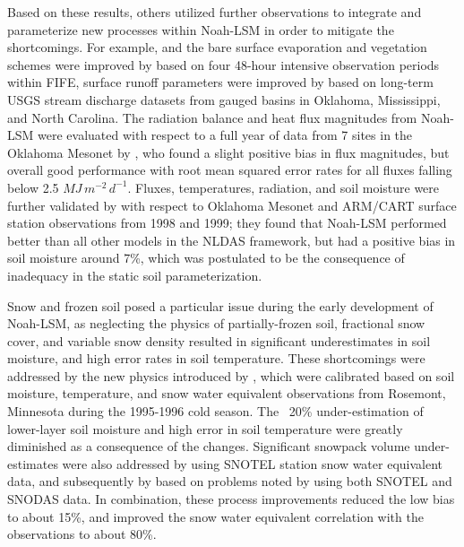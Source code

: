 Based on these results, others utilized further observations to integrate and parameterize new processes within Noah-LSM in order to mitigate the shortcomings. For example, and the bare surface evaporation and vegetation schemes were improved by \citep{betts_assessment_1997} based on four 48-hour intensive observation periods within FIFE, surface runoff parameters were improved by \citep{schaake_simple_1996} based on long-term USGS stream discharge datasets from gauged basins in Oklahoma, Mississippi, and North Carolina. The radiation balance and heat flux magnitudes from Noah-LSM were evaluated with respect to a full year of data from 7 sites in the Oklahoma Mesonet by \citep{sridhar_validation_2002}, who found a slight positive bias in flux magnitudes, but overall good performance with root mean squared error rates for all fluxes falling below 2.5 $MJ\,m^{-2}\,d^{-1}$. Fluxes, temperatures, radiation, and soil moisture were further validated by \citep{robock_evaluation_2003} with respect to Oklahoma Mesonet and ARM/CART surface station observations from 1998 and 1999; they found that Noah-LSM performed better than all other models in the NLDAS framework, but had a positive bias in soil moisture around 7\%, which was postulated to be the consequence of inadequacy in the static soil parameterization.

Snow and frozen soil posed a particular issue during the early development of Noah-LSM, as neglecting the physics of partially-frozen soil, fractional snow cover, and variable snow density resulted in significant underestimates in soil moisture, and high error rates in soil temperature. These shortcomings were addressed by the new physics introduced by \citep{koren_parameterization_1999}, which were calibrated based on soil moisture, temperature, and snow water equivalent observations from Rosemont, Minnesota during the 1995-1996 cold season. The ~20\% under-estimation of lower-layer soil moisture and high error in soil temperature were greatly diminished as a consequence of the changes. Significant snowpack volume under-estimates were also addressed by \citep{livneh_noah_2009} using SNOTEL station snow water equivalent data, and subsequently by \citep{barlage_noah_2010} based on problems noted by \citep{pan_snow_2003} using both SNOTEL and SNODAS data. In combination, these process improvements reduced the low bias to about 15\%, and improved the snow water equivalent correlation with the observations to about 80\%.

